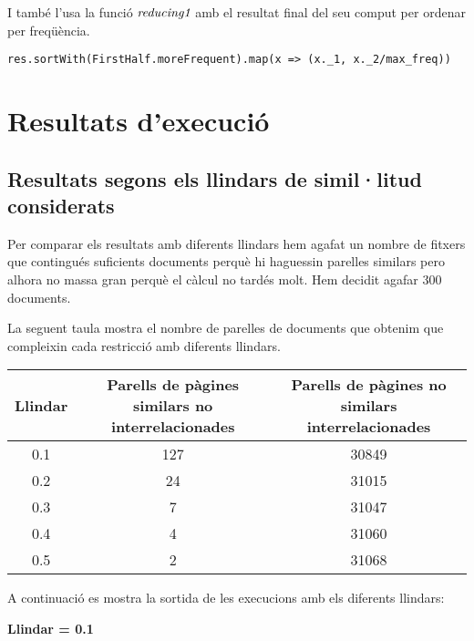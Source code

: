 \documentclass{report}
\begin{document}
I també l'usa la funció $ \emph{reducing1} $ amb el resultat final del seu comput per ordenar per freqüència.

\begin{lstlisting}[style=scalaHighlight]
    res.sortWith(FirstHalf.moreFrequent).map(x => (x._1, x._2/max_freq))
\end{lstlisting}

\chapter{Resultats d'execució}

\section{Resultats segons els llindars de simil·litud considerats}

Per comparar els resultats amb diferents llindars hem agafat un nombre de fitxers que contingués suficients documents perquè hi haguessin parelles similars pero alhora no massa gran perquè el càlcul no tardés molt. Hem decidit agafar 300 documents.

La seguent taula mostra el nombre de parelles de documents que obtenim que compleixin cada restricció amb diferents llindars.


\begin{center}
    \begin{tabular}{| c | c | c |}
    \hline
    Llindar & Parells de pàgines similars no interrelacionades & Parells de pàgines no similars interrelacionades \\ \hline 
    0.1 & 127 & 30849 \\ \hline
    0.2 & 24  & 31015 \\ \hline
    0.3 & 7   & 31047 \\ \hline
    0.4 & 4   & 31060 \\ \hline
    0.5 & 2   & 31068 \\
    \hline
    \end{tabular}
\end{center}

A continuació es mostra la sortida de les execucions amb els diferents llindars:
\newline
\newline
\centerline{ \textbf{Llindar = 0.1} }
\end{document}
